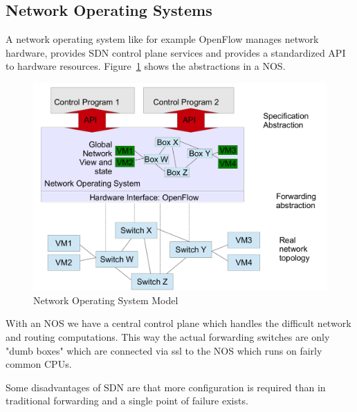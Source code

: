 \subsection{Network Operating Systems}
A network operating system like for example OpenFlow manages network hardware, provides SDN control plane services and provides a standardized API to hardware resources.
Figure~\ref{fig:network_operating_system} shows the abstractions in a NOS.
\begin{figure}[h]
  \centering
  \includegraphics[width=.6\textwidth]{figures/network_operating_system.png}
  \caption{Network Operating System Model}\label{fig:network_operating_system}
\end{figure}
With an NOS we have a central control plane which handles the difficult network and routing computations.
This way the actual forwarding switches are only "dumb boxes" which are connected via ssl to the NOS which runs on fairly common CPUs.

Some disadvantages of SDN are that more configuration is required than in traditional forwarding and a single point of failure exists.
